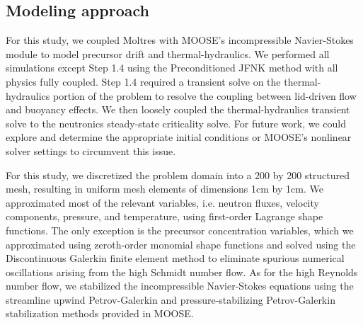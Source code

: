 \subsection{Modeling approach}

For this study, we coupled Moltres with \gls{MOOSE}'s
incompressible Navier-Stokes module \cite{peterson_overview_2017} to
model precursor drift and thermal-hydraulics. We performed all simulations
except Step 1.4 using the Preconditioned \gls{JFNK} method with all physics
fully coupled. Step 1.4 required a transient solve on the thermal-hydraulics
portion of the problem to resolve the coupling between lid-driven flow and
buoyancy effects. We then loosely coupled the thermal-hydraulics transient
solve to the neutronics steady-state criticality solve. For future work, we
could explore and determine the appropriate initial conditions or \gls{MOOSE}'s
nonlinear solver settings to circumvent this issue.

For this study, we discretized the problem domain into a 200 by 200 structured
mesh, resulting in uniform mesh elements of dimensions 1cm by 1cm. We
approximated most of the relevant variables, i.e. neutron fluxes, velocity
components, pressure, and temperature, using first-order Lagrange shape
functions. The only exception is the precursor concentration variables, which
we approximated using zeroth-order monomial shape functions and solved using
the Discontinuous Galerkin finite element method to eliminate spurious
numerical oscillations arising from the high Schmidt number flow. As for the
high Reynolds number flow, we stabilized the incompressible Navier-Stokes
equations using the streamline upwind Petrov-Galerkin and pressure-stabilizing
Petrov-Galerkin stabilization methods \cite{peterson_overview_2017} provided in
\gls{MOOSE}.